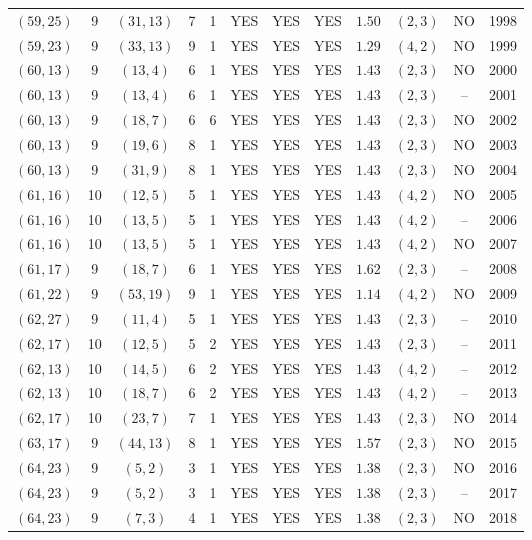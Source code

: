 \begin{longtable}{|c|c|c|c|c|c|c|c|c|c|c|c|}
$(59,25)$ & 9 & $(31,13)$ & 7 & 1 & YES & YES & YES & $1.50$ & $(2,3)$ & NO & 1998\\
$(59,23)$ & 9 & $(33,13)$ & 9 & 1 & YES & YES & YES & $1.29$ & $(4,2)$ & NO & 1999\\
$(60,13)$ & 9 & $(13,4)$ & 6 & 1 & YES & YES & YES & $1.43$ & $(2,3)$ & NO & 2000\\
$(60,13)$ & 9 & $(13,4)$ & 6 & 1 & YES & YES & YES & $1.43$ & $(2,3)$ & -- & 2001\\
$(60,13)$ & 9 & $(18,7)$ & 6 & 6 & YES & YES & YES & $1.43$ & $(2,3)$ & NO & 2002\\
$(60,13)$ & 9 & $(19,6)$ & 8 & 1 & YES & YES & YES & $1.43$ & $(2,3)$ & NO & 2003\\
$(60,13)$ & 9 & $(31,9)$ & 8 & 1 & YES & YES & YES & $1.43$ & $(2,3)$ & NO & 2004\\
$(61,16)$ & 10 & $(12,5)$ & 5 & 1 & YES & YES & YES & $1.43$ & $(4,2)$ & NO & 2005\\
$(61,16)$ & 10 & $(13,5)$ & 5 & 1 & YES & YES & YES & $1.43$ & $(4,2)$ & -- & 2006\\
$(61,16)$ & 10 & $(13,5)$ & 5 & 1 & YES & YES & YES & $1.43$ & $(4,2)$ & NO & 2007\\
$(61,17)$ & 9 & $(18,7)$ & 6 & 1 & YES & YES & YES & $1.62$ & $(2,3)$ & -- & 2008\\
$(61,22)$ & 9 & $(53,19)$ & 9 & 1 & YES & YES & YES & $1.14$ & $(4,2)$ & NO & 2009\\
$(62,27)$ & 9 & $(11,4)$ & 5 & 1 & YES & YES & YES & $1.43$ & $(2,3)$ & -- & 2010\\
$(62,17)$ & 10 & $(12,5)$ & 5 & 2 & YES & YES & YES & $1.43$ & $(2,3)$ & -- & 2011\\
$(62,13)$ & 10 & $(14,5)$ & 6 & 2 & YES & YES & YES & $1.43$ & $(4,2)$ & -- & 2012\\
$(62,13)$ & 10 & $(18,7)$ & 6 & 2 & YES & YES & YES & $1.43$ & $(4,2)$ & -- & 2013\\
$(62,17)$ & 10 & $(23,7)$ & 7 & 1 & YES & YES & YES & $1.43$ & $(2,3)$ & NO & 2014\\
$(63,17)$ & 9 & $(44,13)$ & 8 & 1 & YES & YES & YES & $1.57$ & $(2,3)$ & NO & 2015\\
$(64,23)$ & 9 & $(5,2)$ & 3 & 1 & YES & YES & YES & $1.38$ & $(2,3)$ & NO & 2016\\
$(64,23)$ & 9 & $(5,2)$ & 3 & 1 & YES & YES & YES & $1.38$ & $(2,3)$ & -- & 2017\\
$(64,23)$ & 9 & $(7,3)$ & 4 & 1 & YES & YES & YES & $1.38$ & $(2,3)$ & NO & 2018\\

\end{longtable}
